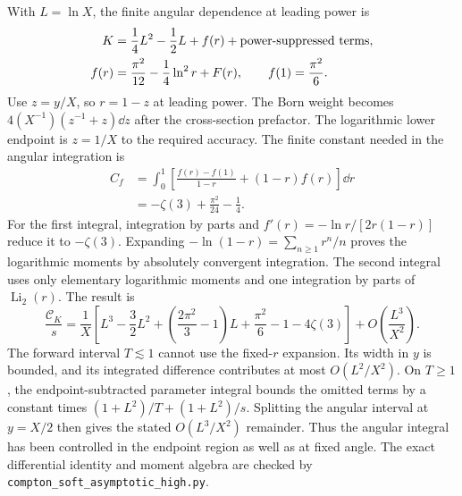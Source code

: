 With $L=\ln X$, the finite angular dependence at leading power is
\begin{align}
 K&=\frac14L^2-\frac12L+f(r)+\hbox{power-suppressed terms},\\
 f(r)&=\frac{\pi^2}{12}-\frac14\ln^2r+F(r),\qquad
 f(1)=\frac{\pi^2}{6}.
\end{align}
Use $z=y/X$, so $r=1-z$ at leading power.  The Born weight becomes
$4(X^{-1})(z^{-1}+z)\dd z$ after the cross-section prefactor.
The logarithmic lower endpoint is $z=1/X$ to the required accuracy.
The finite constant needed in the angular integration is
\begin{align}
 C_f&=\int_0^1\left[\frac{f(r)-f(1)}{1-r}+(1-r)f(r)\right]\dd r\\
 &=-\zeta(3)+\frac{\pi^2}{24}-\frac14.
\end{align}
For the first integral, integration by parts and
$f'(r)=-\ln r/[2r(1-r)]$ reduce it to $-\zeta(3)$.
Expanding $-\ln(1-r)=\sum_{n\geq1}r^n/n$ proves the logarithmic
moments by absolutely convergent integration.  The second integral uses
only elementary logarithmic moments and one integration by parts of
$\operatorname{Li}_2(r)$.
The result is
\begin{equation}
 \frac{\mathcal C_K}{s}
 =\frac1X\left[L^3-\frac32L^2+
 \left(\frac{2\pi^2}{3}-1\right)L
 +\frac{\pi^2}{6}-1-4\zeta(3)\right]
 +O\!\left(\frac{L^3}{X^2}\right).
\end{equation}
The forward interval $T\lesssim1$ cannot use the fixed-$r$ expansion.
Its width in $y$ is bounded, and its integrated difference contributes
at most $O(L^2/X^2)$.  On $T\geq1$, the endpoint-subtracted parameter
integral bounds the omitted terms by a constant times
$(1+L^2)/T+(1+L^2)/s$.  Splitting the angular interval at $y=X/2$
then gives the stated $O(L^3/X^2)$ remainder.  Thus the angular integral
has been controlled in the endpoint region as well as at fixed angle.
The exact differential identity and moment algebra are checked by
\nolinkurl{compton_soft_asymptotic_high.py}.
